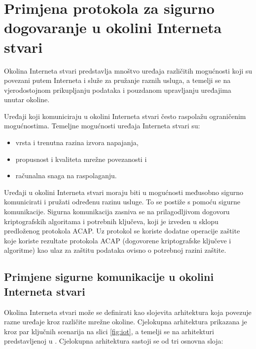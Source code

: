 \chapter{Primjena protokola za sigurno dogovaranje u okolini Interneta stvari}
\label{ch:iot}

Okolina Interneta stvari predstavlja mnoštvo uređaja različitih mogućnosti koji
su povezani putem Interneta i služe za pružanje raznih usluga, a temelji se na
vjerodostojnom prikupljanju podataka i pouzdanom upravljanju uređajima unutar
okoline.

Uređaji koji komuniciraju u okolini Interneta stvari često raspolažu ograničenim
mogućnostima. Temeljne mogućnosti uređaja Interneta stvari su:
\begin{itemize}
    \item vrsta i trenutna razina izvora napajanja,
    \item propusnost i kvaliteta mrežne povezanosti i
    \item računalna snaga na raspolaganju.
\end{itemize}

Uređaji u okolini Interneta stvari moraju biti u mogućnosti međusobno sigurno
komunicirati i pružati određenu razinu usluge. To se postiže s pomoću
sigurne komunikacije. Sigurna komunikacija zasniva se na prilagodljivom
dogovoru kriptografskih algoritama i potrebnih ključeva, koji je izveden u
sklopu
predloženog protokola ACAP. Uz protokol se koriste dodatne operacije zaštite
koje koriste rezultate protokola ACAP (dogovorene kriptografske ključeve i
algoritme) kao ulaz za zaštitu podataka ovisno o potrebnoj razini zaštite.

\section{Primjene sigurne komunikacije u okolini Interneta stvari}
\label{sec:scenarios}

Okolina Interneta stvari može se definirati kao slojevita arhitektura koja povezuje
razne uređaje kroz različite mrežne okoline. Cjelokupna arhitektura prikazana je
kroz par ključnih scenarija na slici \ref{fig:iot}, a temelji se na arhitekturi
predstavljenoj u \cite{perera2014context}. Cjelokupna arhitektura sastoji se od
tri osnovna sloja:

